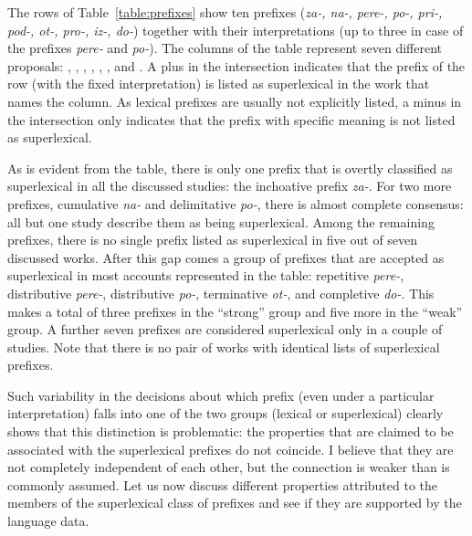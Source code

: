 The rows of Table~\ref{table:prefixes} show ten prefixes (\textit{za-, na-, pere-, po-, pri-, pod-, ot-, pro-, iz-, do-}) together with their interpretations (up to three in case of the prefixes \textit{pere-} and \textit{po-}). The columns of the table represent seven different proposals: \citealt{Babko-Malaya:99}, \citealt{Svenonius:04a}, \citealt{Svenonius:04b}, \citealt{Ramchand:04}, \citealt{Romanova:06}, \citealt{Tatevosov:09}, and \citealt{Svenonius:12}. A plus in the intersection indicates that the prefix of the row (with the fixed interpretation) is listed as superlexical in the work that names the column. As lexical prefixes are usually not explicitly listed, a minus in the intersection only indicates that the prefix with specific meaning is not listed as superlexical.

As is evident from the table, there is only one prefix that is overtly classified as superlexical in all the discussed studies: the inchoative prefix \textit{za-}. For two more prefixes, cumulative \textit{na-} and delimitative \textit{po-}, there is almost complete consensus: all but one study describe them as being superlexical. Among the remaining prefixes, there is no single prefix listed as superlexical in five out of seven discussed works. After this gap comes a group of prefixes that are accepted as superlexical in most accounts represented in the table: repetitive \textit{pere-}, distributive \textit{pere-}, distributive \textit{po-}, terminative \textit{ot-}, and completive \textit{do-}. This makes a total of three prefixes in the ``strong'' group and five more in the ``weak'' group. A further seven prefixes are considered superlexical only in a couple of studies. Note that there is no pair of works with identical lists of superlexical prefixes. 

Such variability in the decisions about which prefix (even under a particular interpretation) falls into one of the two groups (lexical or superlexical) clearly shows that this distinction is problematic: the properties that are claimed to be associated with the superlexical prefixes do not coincide. I believe that they are not completely independent of each other, but the connection is weaker than is commonly assumed. Let us now discuss different properties attributed to the members of the superlexical class of prefixes and see if they are supported by the language data.



